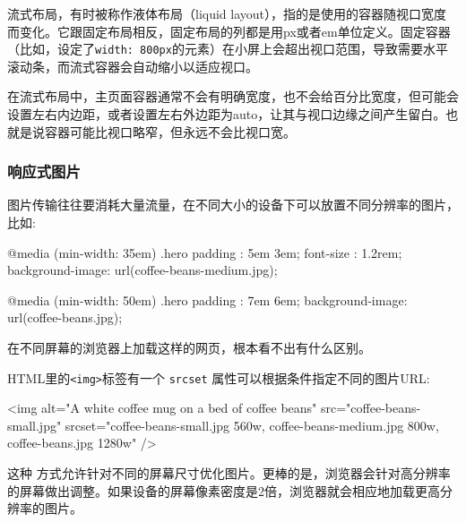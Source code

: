 流式布局，有时被称作液体布局（liquid layout），指的是使用的容器随视口宽度而变化。它跟固定布局相反，固定布局的列都是用px或者em单位定义。固定容器（比如，设定了\texttt{width: 800px}的元素）在小屏上会超出视口范围，导致需要水平滚动条，而流式容器会自动缩小以适应视口。

在流式布局中，主页面容器通常不会有明确宽度，也不会给百分比宽度，但可能会设置左右内边距，或者设置左右外边距为auto，让其与视口边缘之间产生留白。也就是说容器可能比视口略窄，但永远不会比视口宽。

\subsubsection*{响应式图片}

图片传输往往要消耗大量流量，在不同大小的设备下可以放置不同分辨率的图片，比如:

\begin{HTML}
@media (min-width: 35em) {
    .hero {
        padding         : 5em 3em;
        font-size       : 1.2rem;
        background-image: url(coffee-beans-medium.jpg);
    }
}

@media (min-width: 50em) {
    .hero {
        padding         : 7em 6em;
        background-image: url(coffee-beans.jpg);
    }
}
\end{HTML}

在不同屏幕的浏览器上加载这样的网页，根本看不出有什么区别。

HTML里的\texttt{<img>}标签有一个 \texttt{srcset} 属性可以根据条件指定不同的图片URL:

\begin{HTML}
<img alt="A white coffee mug on a bed of coffee beans"
    src="coffee-beans-small.jpg"
    srcset="coffee-beans-small.jpg 560w,
        coffee-beans-medium.jpg 800w,
        coffee-beans.jpg 1280w"
/> 
\end{HTML}

这种 方式允许针对不同的屏幕尺寸优化图片。更棒的是，浏览器会针对高分辨率的屏幕做出调整。如果设备的屏幕像素密度是2倍，浏览器就会相应地加载更高分辨率的图片。